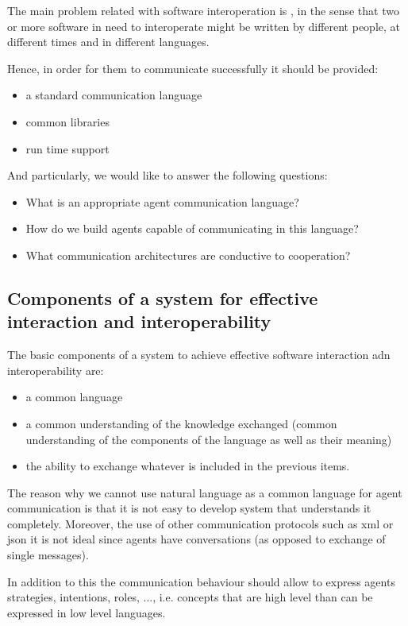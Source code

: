 The main problem related with software interoperation is , in the sense that two or more software in need to interoperate might be written by different people, at different times and in different languages.

Hence, in order for them to communicate successfully it should be provided:
\begin{itemize}
\item a standard communication language
\item common libraries
\item run time support
\end{itemize}
And particularly, we would like to answer the following questions:
\begin{itemize}
\item What is an appropriate agent communication language?
\item How do we build agents capable of communicating in this language?
\item What communication architectures are conductive to cooperation?
\end{itemize}

\subsection{Components of a system for effective interaction and interoperability}
The basic components of a system to achieve effective software interaction adn interoperability are:
\begin{itemize}
\item a common language
\item a common understanding of the knowledge exchanged (common understanding of the components of the language as well as their meaning)
\item the ability to exchange whatever is included in the previous items.
\end{itemize}

The reason why we cannot use natural language as a common language for agent communication is that it is not easy to develop system that understands it completely. 
Moreover, the use of other communication protocols such as xml or json it is not ideal since agents have conversations (as opposed to exchange of single messages).

In addition to this the communication behaviour should allow to express agents strategies, intentions, roles, ..., i.e. concepts that are high level than can be expressed in low level languages.

